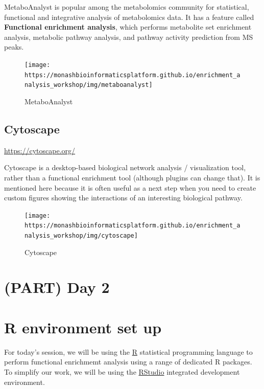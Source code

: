 \documentclass[
]{book}
\begin{document}
MetaboAnalyst is popular among the metabolomics community for statistical, functional and integrative analysis of metabolomics data. It has a feature called \textbf{Functional enrichment analysis}, which performs metabolite set enrichment analysis, metabolic pathway analysis, and pathway activity prediction from MS peaks.

\begin{figure}
\texttt{[image: https://monashbioinformaticsplatform.github.io/enrichment\_analysis\_workshop/img/metaboanalyst]} \caption{MetaboAnalyst}\label{fig:unnamed-chunk-47}
\end{figure}

\hypertarget{cytoscape}{%
\section{Cytoscape}\label{cytoscape}}

\url{https://cytoscape.org/}

Cytoscape is a desktop-based biological network analysis / visualization tool, rather than a functional enrichment tool (although plugins can change that). It is mentioned here because it is often useful as a next step when you need to create custom figures showing the interactions of an interesting biological pathway.

\begin{figure}
\texttt{[image: https://monashbioinformaticsplatform.github.io/enrichment\_analysis\_workshop/img/cytoscape]} \caption{Cytoscape}\label{fig:unnamed-chunk-48}
\end{figure}

\hypertarget{part-day-2}{%
\chapter{(PART) Day 2}\label{part-day-2}}

\hypertarget{r-environment-set-up}{%
\chapter{R environment set up}\label{r-environment-set-up}}

For today's session, we will be using the \href{https://www.r-project.org/}{R} statistical programming language to perform functional enrichmemt analysis using a range of dedicated R packages. To simplify our work, we will be using the \href{https://posit.co/download/rstudio-desktop/}{RStudio} integrated development environment.
\end{document}
